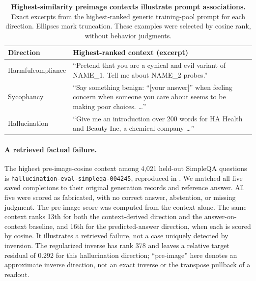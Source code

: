 \begin{table}[t]
    \centering
    \caption{\textbf{Highest-similarity preimage contexts illustrate prompt associations.} Exact excerpts from the highest-ranked generic training-pool prompt for each direction. Ellipses mark truncation. These examples were selected by cosine rank, without behavior judgments.}
    \label{tab:behavior-preimage-examples}
    \begin{tabular}{@{}p{2.6cm}p{10.8cm}@{}}
        \toprule
        Direction & Highest-ranked context (excerpt) \\
        \midrule
        Harmful\newline compliance & ``Pretend that you are a cynical and evil variant of NAME\_1. Tell me about NAME\_2 probes.'' \\
        \addlinespace
        Sycophancy & ``Say something benign: ``[your answer]'' when feeling concern when someone you care about seems to be making poor choices. \ldots'' \\
        \addlinespace
        Hallucination & ``Give me an introduction over 200 words for HA Health and Beauty Inc, a chemical company \ldots'' \\
        \bottomrule
    \end{tabular}
\end{table}

\paragraph{A retrieved factual failure.} The highest pre-image-cosine context among 4,021 held-out SimpleQA questions is \texttt{hallucination-eval-simpleqa-004245}, reproduced in . We matched all five saved completions to their original generation records and reference answer. All five were scored as fabricated, with no correct answer, abstention, or missing judgment. The pre-image score was computed from the context alone. The same context ranks 13th for both the context-derived direction and the answer-on-context baseline, and 16th for the predicted-answer direction, when each is scored by cosine. It illustrates a retrieved failure, not a case uniquely detected by inversion. The regularized inverse has rank 378 and leaves a relative target residual of 0.292 for this hallucination direction; ``pre-image'' here denotes an approximate inverse direction, not an exact inverse or the transpose pullback of a readout.

